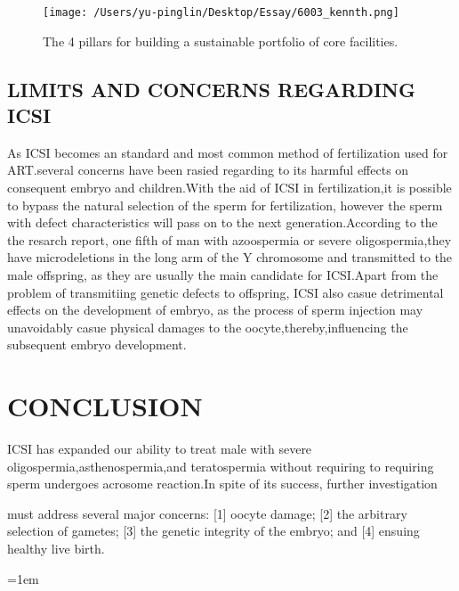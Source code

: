 \documentclass[12pt]{article}
\begin{document}
\begin{figure}[H]
    \texttt{[image: /Users/yu-pinglin/Desktop/Essay/6003\_kennth.png]}
    \centering
    \caption{The 4 pillars for building a sustainable portfolio of
    core facilities.}
\end{figure}

\subsection{LIMITS AND CONCERNS REGARDING ICSI}
As ICSI becomes an standard and most common method of fertilization used for ART.several concerns have been  rasied regarding to its harmful effects on consequent embryo and children.With the aid of ICSI in fertilization,it is possible to bypass the natural selection of the sperm for fertilization, however the sperm with defect characteristics will pass on to the next generation.According to the the resarch report, one fifth of man with azoospermia or severe oligospermia,they have microdeletions in the long arm of the Y chromosome and transmitted to the male offspring, as they are usually the main candidate for ICSI.Apart from the problem of transmitiing genetic defects to offspring, ICSI also casue detrimental effects on the development of embryo, as the process of sperm injection may unavoidably casue physical damages to the oocyte,thereby,influencing the subsequent embryo development.
\section{CONCLUSION}
ICSI has expanded our ability to treat male with severe oligospermia,asthenospermia,and teratospermia without requiring
to requiring sperm undergoes acrosome reaction.In spite of its success, further investigation

must address several major
concerns: [1] oocyte damage; [2] the arbitrary selection
of gametes; [3] the genetic integrity of the embryo;
and [4] ensuing healthy live birth.

\emergencystretch=1em
\printbibliography[title=Reference]
\end{document}
